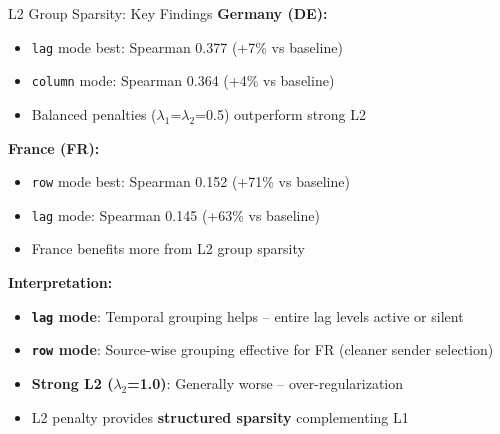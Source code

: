 \documentclass[aspectratio=169]{beamer}
\begin{document}
\begin{frame}{L2 Group Sparsity: Key Findings}
\textbf{Germany (DE):}
\begin{itemize}
    \item \textcolor{reprogreen}{\texttt{lag} mode best}: Spearman 0.377 (+7\% vs baseline)
    \item \textcolor{reprogreen}{\texttt{column} mode}: Spearman 0.364 (+4\% vs baseline)
    \item Balanced penalties ($\lambda_1$=$\lambda_2$=0.5) outperform strong L2
\end{itemize}

\vspace{0.3cm}
\textbf{France (FR):}
\begin{itemize}
    \item \textcolor{reprogreen}{\texttt{row} mode best}: Spearman 0.152 (+71\% vs baseline)
    \item \textcolor{reprogreen}{\texttt{lag} mode}: Spearman 0.145 (+63\% vs baseline)
    \item France benefits more from L2 group sparsity
\end{itemize}

\vspace{0.3cm}
\textbf{Interpretation:}
\begin{itemize}
    \item \textbf{\texttt{lag} mode}: Temporal grouping helps -- entire lag levels active or silent
    \item \textbf{\texttt{row} mode}: Source-wise grouping effective for FR (cleaner sender selection)
    \item \textbf{Strong L2 ($\lambda_2$=1.0)}: Generally worse -- over-regularization
    \item L2 penalty provides \textbf{structured sparsity} complementing L1
\end{itemize}
\end{frame}
\end{document}
